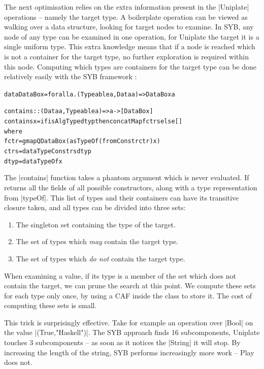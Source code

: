 \documentclass[preprint]{sigplanconf}
\newenvironment{code}{\begin{alltt}\small}{\end{alltt}}
\begin{document}
The next optimisation relies on the extra information present in the |Uniplate| operations -- namely the target type. A boilerplate operation can be viewed as walking over a data structure, looking for target nodes to examine. In SYB, any node of any type can be examined in one operation, for Uniplate the target it is a single uniform type. This extra knowledge means that if a node is reached which is not a container for the target type, no further exploration is required within this node. Computing which types are containers for the target type can be done relatively easily with the SYB framework \citep{lammel:syb2}:

\begin{code}
data DataBox = forall a . (Typeable a, Data a) => DataBox a

contains :: (Data a, Typeable a) => a -> [DataBox]
contains x = if isAlgType dtyp then concatMap f ctrs else []
    where
        f ctr = gmapQ DataBox (asTypeOf (fromConstr ctr) x)
        ctrs = dataTypeConstrs dtyp
        dtyp = dataTypeOf x
\end{code}

The |contains| function takes a phantom argument which is never evaluated. If returns all the fields of all possible constructors, along with a type representation from |typeOf|. This list of types and their containers can have its transitive closure taken, and all types can be divided into three sets:

\begin{enumerate}
\item The singleton set containing the type of the target.
\item The set of types which \textit{may} contain the target type.
\item The set of types which \textit{do not} contain the target type.
\end{enumerate}

When examining a value, if its type is a member of the set which does not contain the target, we can prune the search at this point. We compute these sets for each type only once, by using a CAF inside the class to store it. The cost of computing these sets is small.

This trick is surprisingly effective. Take for example an operation over |Bool| on the value |(True,"Haskell")|. The SYB approach finds 16 subcomponents, Uniplate touches 3 subcomponents -- as soon as it notices the |String| it will stop. By increasing the length of the string, SYB performs increasingly more work -- Play does not.
\end{document}
